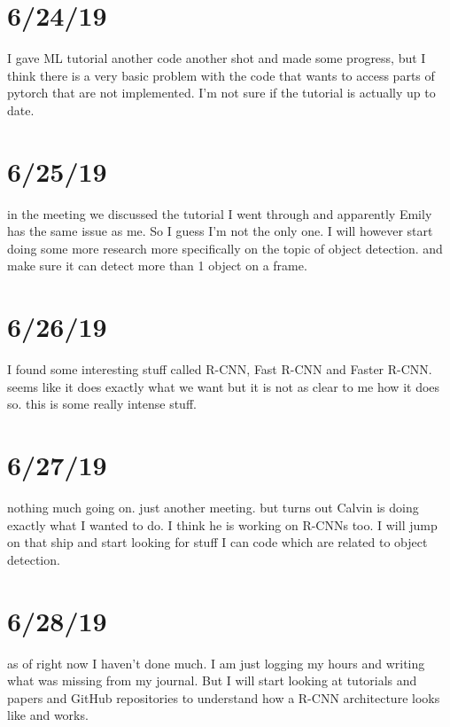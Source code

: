 \documentclass{article}
\begin{document}
\section{6/24/19}
I gave ML tutorial another code another shot and made some progress, but I think there is a very basic problem with the code that wants to access parts of pytorch that are not implemented. I’m not sure if the tutorial is actually up to date.

\section{6/25/19}
in the meeting we discussed the tutorial I went through and apparently Emily has the same issue as me. So I guess I’m not the only one. I will however start doing some more research more specifically on the topic of object detection. and make sure it can detect more than 1 object on a frame.

\section{6/26/19}
I found some interesting stuff called R-CNN, Fast R-CNN and Faster R-CNN. seems like it does exactly what we want but it is not as clear to me how it does so. this is some really intense stuff.

\section{6/27/19}
nothing much going on. just another meeting. but turns out Calvin is doing exactly what I wanted to do. I think he is working on R-CNNs too. I will jump on that ship and start looking for stuff I can code which are related to object detection.

\section{6/28/19}
as of right now I haven’t done much. I am just logging my hours and writing what was missing from my journal. But I will start looking at tutorials and papers and GitHub repositories to understand how a R-CNN architecture looks like and works.
\end{document}
